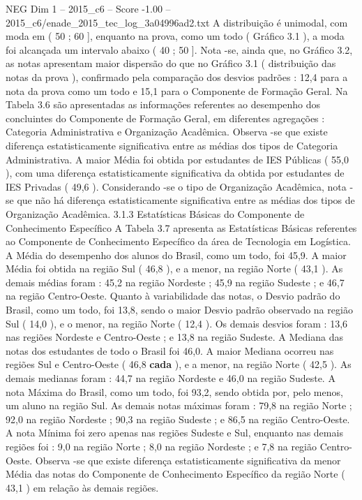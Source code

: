 \begin{textsample}{NEG Dim 1 – 2015\_c6 – Score -1.00 – 2015\_c6/enade\_2015\_tec\_log\_3a04996ad2.txt}
A distribuição é unimodal, com moda em ( 50 ; 60 ], enquanto na prova, como um todo ( Gráfico 3.1 ), a moda foi alcançada um intervalo abaixo ( 40 ; 50 ].
Nota -se, ainda que, no Gráfico 3.2, as notas apresentam maior dispersão do que no Gráfico 3.1 ( distribuição das notas da prova ), confirmado pela comparação dos desvios padrões : 12,4 para a nota da prova como um todo e 15,1 para o Componente de Formação Geral.
Na Tabela 3.6 são apresentadas as informações referentes ao desempenho dos concluintes do Componente de Formação Geral, em diferentes agregações : Categoria Administrativa e Organização Acadêmica.
Observa -se que existe diferença estatisticamente significativa entre as médias dos tipos de Categoria Administrativa.
A maior Média foi obtida por estudantes de IES Públicas ( 55,0 ), com uma diferença estatisticamente significativa da obtida por estudantes de IES Privadas ( 49,6 ).
Considerando -se o tipo de Organização Acadêmica, nota -se que não há diferença estatisticamente significativa entre as médias dos tipos de Organização Acadêmica. 3.1.3 Estatísticas Básicas do Componente de Conhecimento Específico A Tabela 3.7 apresenta as Estatísticas Básicas referentes ao Componente de Conhecimento Específico da área de Tecnologia em Logística.
A Média do desempenho dos alunos do Brasil, como um todo, foi 45,9.
A maior Média foi obtida na região Sul ( 46,8 ), e a menor, na região Norte ( 43,1 ).
As demais médias foram : 45,2 na região Nordeste ; 45,9 na região Sudeste ; e 46,7 na região Centro-Oeste.
Quanto à variabilidade das notas, o Desvio padrão do Brasil, como um todo, foi 13,8, sendo o maior Desvio padrão observado na região Sul ( 14,0 ), e o menor, na região Norte ( 12,4 ).
Os demais desvios foram : 13,6 nas regiões Nordeste e Centro-Oeste ; e 13,8 na região Sudeste.
A Mediana das notas dos estudantes de todo o Brasil foi 46,0.
A maior Mediana ocorreu nas regiões Sul e Centro-Oeste ( 46,8 \textbf{cada} ), e a menor, na região Norte ( 42,5 ).
As demais medianas foram : 44,7 na região Nordeste e 46,0 na região Sudeste.
A nota Máxima do Brasil, como um todo, foi 93,2, sendo obtida por, pelo menos, um aluno na região Sul.
As demais notas máximas foram : 79,8 na região Norte ; 92,0 na região Nordeste ; 90,3 na região Sudeste ; e 86,5 na região Centro-Oeste.
A nota Mínima foi zero apenas nas regiões Sudeste e Sul, enquanto nas demais regiões foi : 9,0 na região Norte ; 8,0 na região Nordeste ; e 7,8 na região Centro-Oeste.
Observa -se que existe diferença estatisticamente significativa da menor Média das notas do Componente de Conhecimento Específico da região Norte ( 43,1 ) em relação às demais regiões.

\end{textsample}
